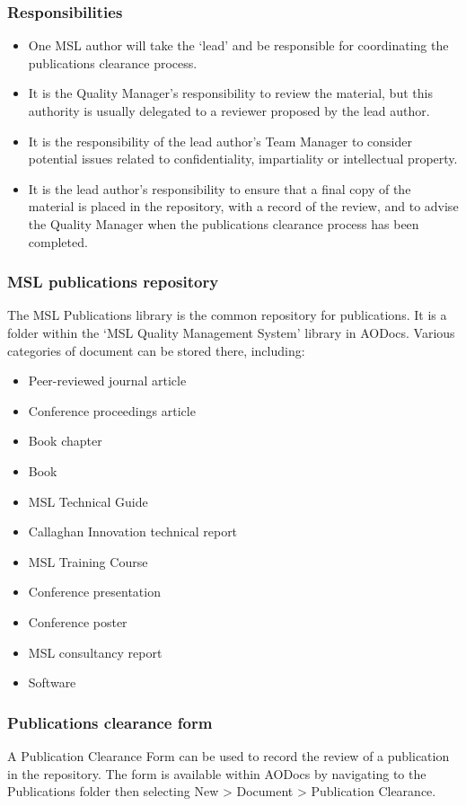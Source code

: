 \subsubsection{Responsibilities}
\begin{itemize}
\item  One MSL author will take the `lead' and be responsible for coordinating the publications clearance process.
\item  It is the Quality Manager's responsibility to review the material, but this authority is usually delegated to a reviewer proposed by the lead author.
\item  It is the responsibility of the lead author's Team Manager to consider potential issues related to confidentiality, impartiality or intellectual property.
\item  It is the lead author's responsibility to ensure that a final copy of the material is placed in the repository, with a record of the review, and to advise the Quality Manager when the publications clearance process has been completed.
\end{itemize}

\subsubsection{MSL publications repository}
 \label{sss:publications_repository}
The MSL Publications library is the common repository for publications. It is a folder within the `MSL Quality Management System' library in AODocs. Various categories of document can be stored there, including: 
\begin{itemize}
 \item Peer-reviewed journal article
 \item Conference proceedings article 
 \item Book chapter
 \item Book
 \item MSL Technical Guide
 \item Callaghan Innovation technical report 
 \item MSL Training Course 
 \item Conference presentation 
 \item Conference poster
 \item MSL consultancy report
 \item Software
\end{itemize}

\subsubsection{Publications clearance form}
A Publication Clearance Form can be used to record the review of a publication in the repository. The form is available within AODocs by navigating to the Publications folder then selecting New > Document > Publication Clearance.

